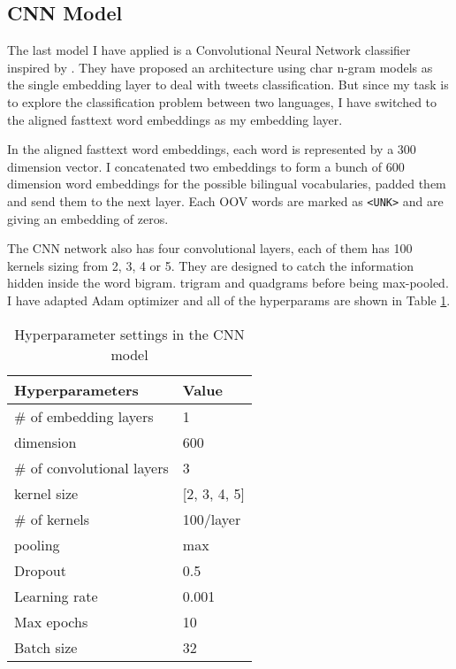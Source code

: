\documentclass[11pt,a4paper]{article}
\begin{document}
\subsection{CNN Model}

The last model I have applied is a Convolutional Neural Network classifier inspired by \citet{shrestha2017convolutional}. They have proposed an architecture using char n-gram models as the single embedding layer to deal with tweets classification. But since my task is to explore the classification problem between two languages, I have switched to the aligned fasttext word embeddings \cite{bojanowski2017enriching} \cite{joulin2018loss} as my embedding layer.

In the aligned fasttext word embeddings, each word is represented by a 300 dimension vector. I concatenated two embeddings to form a bunch of 600 dimension word embeddings for the possible bilingual vocabularies, padded them and send them to the next layer. Each OOV words are marked as \verb|<UNK>| and are giving an embedding of zeros.

The CNN network also has four convolutional layers, each of them has 100 kernels sizing from 2, 3, 4 or 5. They are designed to catch the information hidden inside the word bigram. trigram and quadgrams before being max-pooled. I have adapted Adam optimizer \cite{kingma2014adam} and all of the hyperparams are shown in Table \ref{tab:cnn-hyperparams-table}.

\begin{table}[t]
  \begin{center}
  \begin{tabular}{|l|l|}
  \hline \bf Hyperparameters & \bf Value \\ \hline
  \# of embedding layers & 1 \\
  \hspace{0.5cm} dimension & 600 \\
  \# of convolutional layers & 3 \\
  \hspace{0.5cm} kernel size & [2, 3, 4, 5] \\
  \hspace{0.5cm} \# of kernels & 100/layer \\
  \hspace{0.5cm} pooling & max \\
  Dropout & 0.5 \\
  Learning rate & 0.001 \\
  Max epochs & 10 \\
  Batch size & 32 \\
  \hline
  \end{tabular}
  \end{center}
  \caption{\label{tab:cnn-hyperparams-table} Hyperparameter settings in the CNN model}
\end{table}



\end{document}
